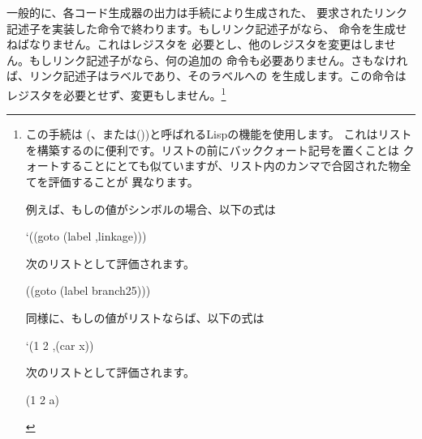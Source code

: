 一般的に、各コード生成器の出力は手続により生成された、
要求されたリンク記述子を実装した命令で終わります。もしリンク記述子がなら、
命令を生成せねばなりません。これはレジスタを
必要とし、他のレジスタを変更はしません。もしリンク記述子がなら、何の追加の
命令も必要ありません。さもなければ、リンク記述子はラベルであり、そのラベルへの
を生成します。この命令はレジスタを必要とせず、変更もしません。\footnote{
この手続は
(、または())と呼ばれるLispの機能を使用します。
これはリストを構築するのに便利です。リストの前にバッククォート記号を置くことは
クォートすることにとても似ていますが、リスト内のカンマで合図された物全てを評価することが
異なります。


例えば、もしの値がシンボルの場合、以下の式は

\begin{smallscheme}
`((goto (label ,linkage)))
\end{smallscheme}


次のリストとして評価されます。

\begin{smallscheme}
((goto (label branch25)))
\end{smallscheme}


同様に、もしの値がリストならば、以下の式は

\begin{smallscheme}
`(1 2 ,(car x))
\end{smallscheme}


次のリストとして評価されます。

\begin{smallscheme}
(1 2 a)
\end{smallscheme}
}


